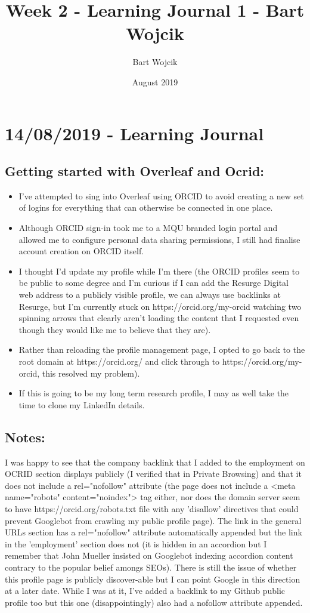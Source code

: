 \documentclass{article}
\title{Week 2 - Learning Journal 1 - Bart Wojcik}
\author{Bart Wojcik}
\date{August 2019}
\begin{document}
\maketitle

\section{14/08/2019 - Learning Journal}
\subsection{Getting started with Overleaf and Ocrid:}
\medskip
\begin{itemize}
    \item I've attempted to sing into Overleaf using ORCID to avoid creating a new set of logins for everything that can otherwise be connected in one place.
    \item Although ORCID sign-in took me to a MQU branded login portal and allowed me to configure personal data sharing permissions, I still had finalise account creation on ORCID itself. 
    \item I thought I'd update my profile while I'm there (the ORCID profiles seem to be public to some degree and I'm curious if I can add the Resurge Digital web address to a publicly visible profile, we can always use backlinks at Resurge, but I'm currently stuck on https://orcid.org/my-orcid watching two spinning arrows that clearly aren't loading the content that I requested even though they would like me to believe that they are). 
    \item Rather than reloading the profile management page, I opted to go back to the root domain at https://orcid.org/ and click through to https://orcid.org/my-orcid, this resolved my problem). 
    \item If this is going to be my long term research profile, I may as well take the time to clone my LinkedIn details. 
\end{itemize}
\subsection{Notes:}
I was happy to see that the company backlink that I added to the employment on OCRID section displays publicly (I verified that in Private Browsing) and that it does not include a rel="nofollow" attribute (the page does not include a <meta name="robots" content="noindex"> tag either, nor does the domain server seem to have https://orcid.org/robots.txt file with any 'disallow' directives that could prevent Googlebot from crawling my public profile page). The link in the general URLs section has a rel="nofollow" attribute automatically appended but the link in the 'employment' section does not (it is hidden in an accordion but I remember that John Mueller insisted on Googlebot indexing accordion content contrary to the popular belief amongs SEOs). There is still the issue of whether this profile page is publicly discover-able but I can point Google in this direction at a later date. While I was at it, I've added a backlink to my Github public profile too but this one (disappointingly) also had a nofollow attribute appended.
\end{document}
